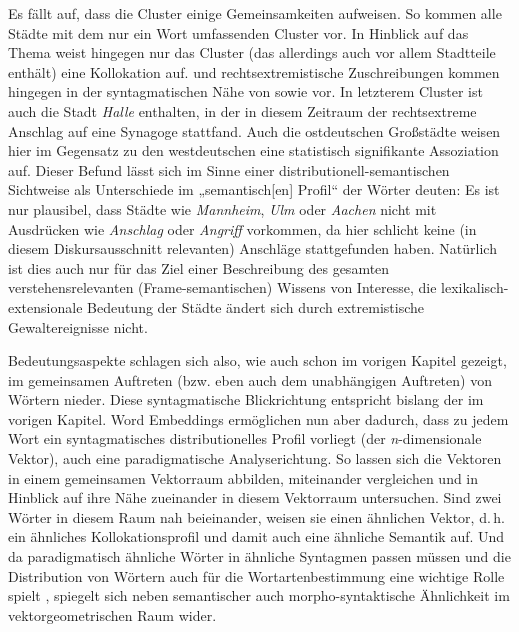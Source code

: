 Es fällt auf, dass die Cluster einige Gemeinsamkeiten aufweisen. So kommen alle Städte mit dem nur ein Wort umfassenden Cluster  vor. In Hinblick auf das Thema  weist hingegen nur das Cluster  (das allerdings auch vor allem Stadtteile enthält) eine Kollokation auf.  und rechtsextremistische Zuschreibungen kommen hingegen in der syntagmatischen Nähe von  sowie  vor. In letzterem Cluster ist auch die Stadt \emph{Halle} enthalten, in der in diesem Zeitraum der rechtsextreme Anschlag auf eine Synagoge stattfand. Auch die ostdeutschen Großstädte weisen hier im Gegensatz zu den westdeutschen eine statistisch signifikante Assoziation auf. Dieser Befund lässt sich im Sinne einer distributionell-semantischen Sichtweise als Unterschiede im „semantisch{[}en{]} Profil`` \autocite[565]{bubenhoferSemantischeAquivalenzGeburtserzahlungen2020} der Wörter deuten: Es ist nur plausibel, dass Städte wie \emph{Mannheim}, \emph{Ulm} oder \emph{Aachen} nicht mit Ausdrücken wie \emph{Anschlag} oder \emph{Angriff} vorkommen, da hier schlicht keine (in diesem Diskursausschnitt relevanten) Anschläge stattgefunden haben. Natürlich ist dies auch nur für das Ziel einer Beschreibung des gesamten verstehensrelevanten (Frame-semantischen) Wissens von Interesse, die lexikalisch-extensionale Bedeutung der Städte ändert sich durch extremistische Gewaltereignisse nicht.

Bedeutungsaspekte schlagen sich also, wie auch schon im vorigen Kapitel gezeigt, im gemeinsamen Auftreten (bzw. eben auch dem unabhängigen Auftreten) von Wörtern nieder. Diese syntagmatische Blickrichtung entspricht bislang der im vorigen Kapitel. Word Embeddings ermöglichen nun aber dadurch, dass zu jedem Wort ein syntagmatisches distributionelles Profil vorliegt (der \emph{n}-dimensionale Vektor), auch eine paradigmatische Analyserichtung. So lassen sich die Vektoren in einem gemeinsamen Vektorraum abbilden, miteinander vergleichen und in Hinblick auf ihre Nähe zueinander in diesem Vektorraum untersuchen. Sind zwei Wörter in diesem Raum nah beieinander, weisen sie einen ähnlichen Vektor, d.\,h. ein ähnliches Kollokationsprofil und damit auch eine ähnliche Semantik auf. Und da paradigmatisch ähnliche Wörter in ähnliche Syntagmen passen müssen und die Distribution von Wörtern auch für die Wortartenbestimmung eine wichtige Rolle spielt \autocite[insbesondere etwa bei][]{helbigDeutscheGrammatikHandbuch2013}, spiegelt sich neben semantischer auch morpho-syntaktische Ähnlichkeit im vektorgeometrischen Raum wider.

